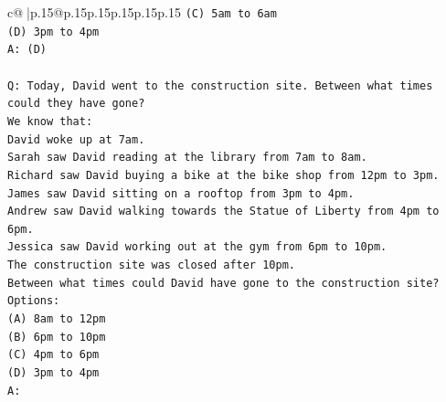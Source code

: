 \documentclass{article}
\begin{document}
{\begin{supertabular}{c@{$\;$}|p{.15\linewidth}@{}p{.15\linewidth}p{.15\linewidth}p{.15\linewidth}p{.15\linewidth}p{.15\linewidth}}
{{{\texttt{(C) 5am to 6am} \\
\texttt{(D) 3pm to 4pm} \\
\texttt{A: (D)} \\
\\ 
\texttt{Q: Today, David went to the construction site. Between what times could they have gone?} \\
\texttt{We know that:} \\
\texttt{David woke up at 7am.} \\
\texttt{Sarah saw David reading at the library from 7am to 8am.} \\
\texttt{Richard saw David buying a bike at the bike shop from 12pm to 3pm.} \\
\texttt{James saw David sitting on a rooftop from 3pm to 4pm.} \\
\texttt{Andrew saw David walking towards the Statue of Liberty from 4pm to 6pm.} \\
\texttt{Jessica saw David working out at the gym from 6pm to 10pm.} \\
\texttt{The construction site was closed after 10pm.} \\
\texttt{Between what times could David have gone to the construction site?} \\
\texttt{Options:} \\
\texttt{(A) 8am to 12pm} \\
\texttt{(B) 6pm to 10pm} \\
\texttt{(C) 4pm to 6pm} \\
\texttt{(D) 3pm to 4pm} \\
\texttt{A:} \\
            }
        }
    }
     \\ \\


\end{supertabular}}
\end{document}
